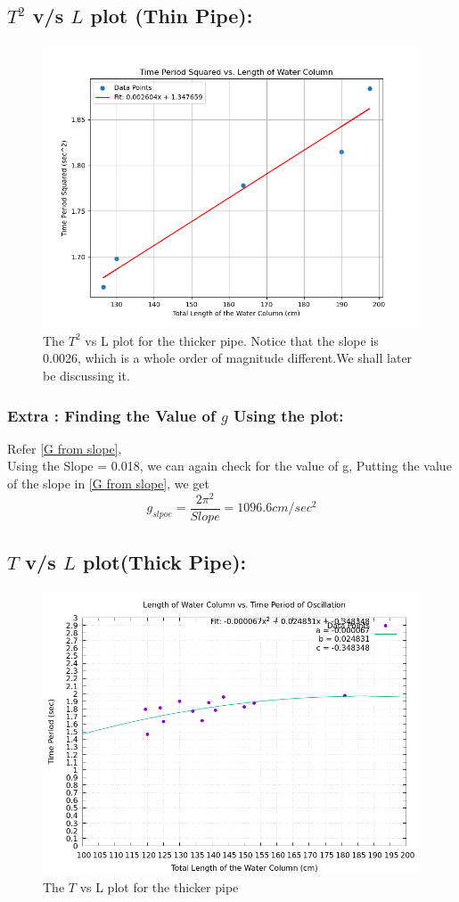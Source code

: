 \documentclass[twocolumn,11pt]{article}
\begin{document}
\subsection{$T^2$ v/s $L$ plot (Thin Pipe):}
\begin{figure}[H]
    \centering
    \includegraphics[scale=0.4]{T2L using matplotlib.png}
    \caption{The $T^2$ vs L plot for the thicker pipe. Notice that the slope is 0.0026, which is a whole order of magnitude different.We shall later be discussing it.}
    \label{T2_vs_L}
\end{figure}
\subsubsection{Extra : Finding the Value of $g$ Using the plot:}
Refer \eqref{G from slope},\\
Using the Slope = 0.018, we can again check for the value of g,
Putting the value of the slope in \eqref{G from slope}, we get
$$g_{slpoe} = \frac{2\pi^2}{Slope} = 1096.6 cm/sec^2$$
\subsection{$T$ v/s $L$ plot(Thick Pipe):}
\begin{figure}[H]
    \centering
    \includegraphics[scale=0.3]{L_vs_T.png}
    \caption{The $T$ vs L plot for the thicker pipe}
    \label{T2_vs_L}
\end{figure}
\end{document}
